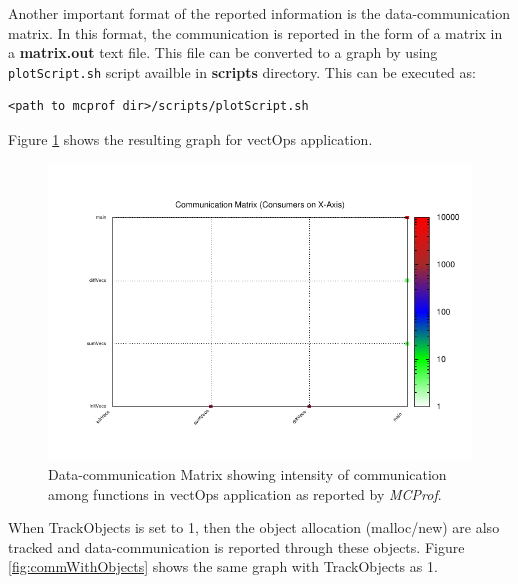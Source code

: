\documentclass[11pt]{article}
\newcommand{\MCPROF}{\emph{MCProf}}
\begin{document}
Another important format of the reported information is the data-communication
matrix. In this format, the communication is reported in the form of a matrix in
a \textbf{matrix.out} text file.
This file can be converted to a graph by using \verb|plotScript.sh| script
availble in \textbf{scripts} directory. This can be executed as:

{
\small
\begin{Verbatim}[frame=single]
<path to mcprof dir>/scripts/plotScript.sh
\end{Verbatim}
}

Figure \ref{fig:matrix} shows the resulting graph for vectOps application.

\begin{figure}[!h]
\centering
\includegraphics[width=0.95\linewidth]{figures/matrix.pdf}
\caption{Data-communication Matrix showing intensity of communication
    among functions in vectOps application as reported by \MCPROF{}.}
\label{fig:matrix}
\end{figure}


When TrackObjects is set to 1, then the object allocation (malloc/new) are
also tracked and data-communication is reported through these objects. 
Figure \ref{fig:commWithObjects} shows the same graph with TrackObjects as 1.
\end{document}
